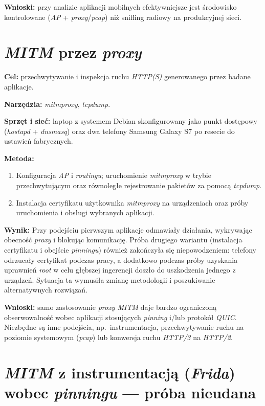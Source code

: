 \textbf{Wnioski:} przy analizie aplikacji mobilnych efektywniejsze jest środowisko kontrolowane (\emph{AP} + \emph{proxy}/\emph{pcap}) niż sniffing radiowy na produkcyjnej sieci.
\section{\emph{MITM} przez \emph{proxy}}

\textbf{Cel:} przechwytywanie i inspekcja ruchu \emph{HTTP(S)} generowanego przez badane aplikacje.

\textbf{Narzędzia:} \textit{mitmproxy}, \textit{tcpdump}.

\textbf{Sprzęt i sieć:} laptop z systemem Debian skonfigurowany jako punkt dostępowy (\emph{hostapd} + \emph{dnsmasq}) oraz dwa telefony Samsung Galaxy S7 po resecie do ustawień fabrycznych.

\textbf{Metoda:}
\begin{enumerate}
  \item Konfiguracja \emph{AP} i \emph{routingu}; uruchomienie \textit{mitmproxy} w trybie przechwytującym oraz równoległe rejestrowanie pakietów za pomocą \textit{tcpdump}.
  \item Instalacja certyfikatu użytkownika \textit{mitmproxy} na urządzeniach oraz próby uruchomienia i obsługi wybranych aplikacji.
\end{enumerate}

\textbf{Wynik:} 
Przy podejściu pierwszym aplikacje odmawiały działania, wykrywając obecność \emph{proxy} i blokując komunikację. Próba drugiego wariantu (instalacja certyfikatu i obejście \emph{pinningu}) również zakończyła się niepowodzeniem: telefony odrzucały certyfikat podczas pracy, a dodatkowo podczas próby uzyskania uprawnień \emph{root} w celu głębszej ingerencji doszło do uszkodzenia jednego z urządzeń. Sytuacja ta wymusiła zmianę metodologii i poszukiwanie alternatywnych rozwiązań.

\textbf{Wnioski:} samo zastosowanie \emph{proxy MITM} daje bardzo ograniczoną obserwowalność wobec aplikacji stosujących \emph{pinning} i/lub protokół \emph{QUIC}. Niezbędne są inne podejścia, np.\ instrumentacja, przechwytywanie ruchu na poziomie systemowym (\emph{pcap}) lub konwersja ruchu \emph{HTTP/3} na \emph{HTTP/2}.

\section{\emph{MITM} z instrumentacją (\emph{Frida}) wobec \emph{pinningu} — próba nieudana}

